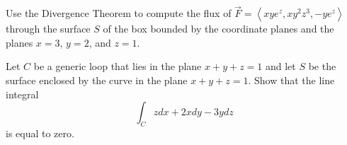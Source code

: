 \documentclass[addpoints, 12pt]{exam}%
\theoremstyle{definition}
\begin{document}
\begin{questions}
Use the Divergence Theorem to compute the flux of $\vec{F} = \left\langle xye^z , xy^2 z^3 , -ye^z \right\rangle$ through the surface $S$ of the box bounded by the coordinate planes and the planes $x = 3$, $y = 2$, and $z = 1$.

\newpage 

\question[10]
Let $C$ be a generic loop that lies in the plane $x + y + z = 1$ and let $S$ be the surface enclosed by the curve in the plane $x + y + z = 1$. Show that the line integral
  \[
    \int_C z dx + 2x dy - 3y dz
  \]
is equal to zero.





\end{questions}
\end{document}
